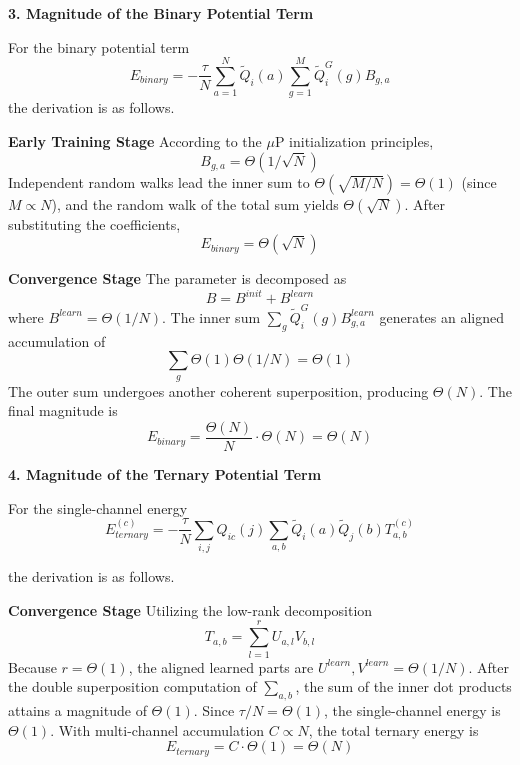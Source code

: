 \documentclass[11pt]{article}
\begin{document}
\textbf{3. Magnitude of the Binary Potential Term}

For the binary potential term 
\begin{equation}
    E_{binary} = -\frac{\tau}{N} \sum_{a=1}^N \tilde{Q}_i(a) \sum_{g=1}^M \tilde{Q}_i^G(g) B_{g,a}
\end{equation}
the derivation is as follows.

\textbf{Early Training Stage} According to the $\mu$P initialization principles, 
\begin{equation}
    B_{g,a} = \Theta(1/\sqrt{N})
\end{equation}
Independent random walks lead the inner sum to $\Theta(\sqrt{M/N}) = \Theta(1)$ (since $M \propto N$), and the random walk of the total sum yields $\Theta(\sqrt{N})$. After substituting the coefficients, 
\begin{equation}
    E_{binary} = \Theta(\sqrt{N})
\end{equation}

\textbf{Convergence Stage} The parameter is decomposed as
\begin{equation}
    B = B^{init} + B^{learn}
\end{equation}
where $B^{learn} = \Theta(1/N)$. The inner sum $\sum_g \tilde{Q}_i^G(g) B_{g,a}^{learn}$ generates an aligned accumulation of 
\begin{equation}
    \sum_g \Theta(1)\Theta(1/N) = \Theta(1)
\end{equation}
The outer sum undergoes another coherent superposition, producing $\Theta(N)$. The final magnitude is 
\begin{equation}
    E_{binary} = \frac{\Theta(N)}{N}\cdot \Theta(N) = \Theta(N)
\end{equation}

\textbf{4. Magnitude of the Ternary Potential Term}

For the single-channel energy
\begin{equation}
    E_{ternary}^{(c)} = -\frac{\tau}{N} \sum_{i,j} Q_{ic}(j) \sum_{a,b} \tilde{Q}_i(a) \tilde{Q}_j(b) T_{a,b}^{(c)}
\end{equation}

the derivation is as follows.

\textbf{Convergence Stage} Utilizing the low-rank decomposition
\begin{equation}
    T_{a,b} = \sum_{l=1}^r U_{a,l} V_{b,l}
\end{equation}
Because $r = \Theta(1)$, the aligned learned parts are $U^{learn}, V^{learn} = \Theta(1/N)$. After the double superposition computation of $\sum_{a,b}$, the sum of the inner dot products attains a magnitude of $\Theta(1)$. Since $\tau/N = \Theta(1)$, the single-channel energy is $\Theta(1)$. With multi-channel accumulation $C \propto N$, the total ternary energy is 
\begin{equation}
    E_{ternary} = C \cdot \Theta(1) = \Theta(N)
\end{equation}
\end{document}
